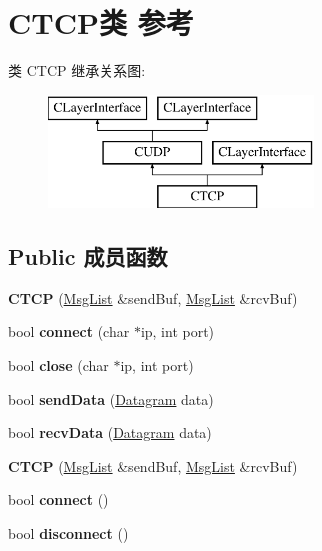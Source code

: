 \hypertarget{class_c_t_c_p}{}\section{C\+T\+C\+P类 参考}
\label{class_c_t_c_p}
类 C\+T\+CP 继承关系图\+:\begin{figure}[H]
\begin{center}
\leavevmode
\includegraphics[height=3.000000cm]{class_c_t_c_p}
\end{center}
\end{figure}
\subsection*{Public 成员函数}
\begin{DoxyCompactItemize}
\item 
\mbox{\label{class_c_t_c_p_a7dee32e3cae74e448df0b4d09fea3d43}} 
{\bfseries C\+T\+CP} (\hyperlink{class_msg_list}{Msg\+List} \&send\+Buf, \hyperlink{class_msg_list}{Msg\+List} \&rcv\+Buf)
\item 
\mbox{\label{class_c_t_c_p_a2437e907d98e436a994c6395f59bf851}} 
bool {\bfseries connect} (char $\ast$ip, int port)
\item 
\mbox{\label{class_c_t_c_p_ab1b3f5ede8f15181ecd3355763e75892}} 
bool {\bfseries close} (char $\ast$ip, int port)
\item 
\mbox{\label{class_c_t_c_p_a4552b74145e832f32c1cb45a9fa2a5e9}} 
bool {\bfseries send\+Data} (\hyperlink{class_datagram}{Datagram} data)
\item 
\mbox{\label{class_c_t_c_p_aed8fdd632e22efee66dbbb95e951b5c2}} 
bool {\bfseries recv\+Data} (\hyperlink{class_datagram}{Datagram} data)
\item 
\mbox{\label{class_c_t_c_p_a7dee32e3cae74e448df0b4d09fea3d43}} 
{\bfseries C\+T\+CP} (\hyperlink{class_msg_list}{Msg\+List} \&send\+Buf, \hyperlink{class_msg_list}{Msg\+List} \&rcv\+Buf)
\item 
\mbox{\label{class_c_t_c_p_a0af93bbde343608a81a4772c38bbdfa6}} 
bool {\bfseries connect} ()
\item 
\mbox{\label{class_c_t_c_p_a382a93d27e10a726d0464402e22517b8}} 
bool {\bfseries disconnect} ()
\end{DoxyCompactItemize}
